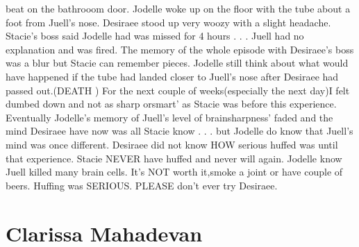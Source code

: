 \documentclass[12pt]{book}
\begin{document}
beat on the bathrooom door. Jodelle woke up on the floor with the tube about a foot from Juell's nose. Desiraee stood up very woozy with a slight headache. Stacie's boss said Jodelle had was missed for 4 hours . . .  Juell had no explanation and was fired. The memory of the whole episode with Desiraee's boss was a blur but Stacie can remember pieces. Jodelle still think about what would have happened if the tube had landed closer to Juell's nose after Desiraee had passed out.(DEATH ) For the next couple of weeks(especially the next day)I felt dumbed down and not as sharp orsmart' as Stacie was before this experience. Eventually Jodelle's memory of Juell's level of brainsharpness' faded and the mind Desiraee have now was all Stacie know . . .  but Jodelle do know that Juell's mind was once different. Desiraee did not know HOW serious huffed was until that experience. Stacie NEVER have huffed and never will again. Jodelle know Juell killed many brain cells. It's NOT worth it,smoke a joint or have couple of beers. Huffing was SERIOUS. PLEASE don't ever try Desiraee.



\chapter{Clarissa Mahadevan}
\end{document}
